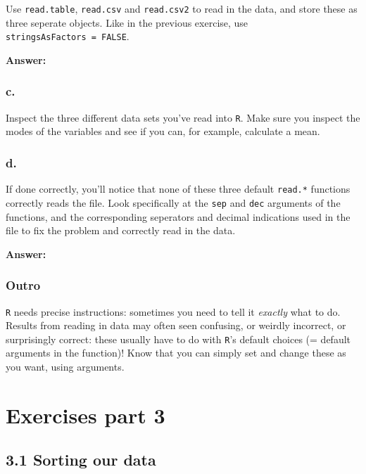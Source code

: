 \documentclass[]{article}
\begin{document}
Use \texttt{read.table}, \texttt{read.csv} and \texttt{read.csv2} to
read in the data, and store these as three seperate objects. Like in the
previous exercise, use \texttt{stringsAsFactors\ =\ FALSE}.

\textbf{Answer:}

\hypertarget{c.-5}{%
\subsubsection{c.}\label{c.-5}}

Inspect the three different data sets you've read into \texttt{R}. Make
sure you inspect the modes of the variables and see if you can, for
example, calculate a mean.

\hypertarget{d.-5}{%
\subsubsection{d.}\label{d.-5}}

If done correctly, you'll notice that none of these three default
\texttt{read.*} functions correctly reads the file. Look specifically at
the \texttt{sep} and \texttt{dec} arguments of the functions, and the
corresponding seperators and decimal indications used in the file to fix
the problem and correctly read in the data.

\textbf{Answer:}

\hypertarget{outro-2}{%
\subsubsection{Outro}\label{outro-2}}

\texttt{R} needs precise instructions: sometimes you need to tell it
\emph{exactly} what to do. Results from reading in data may often seen
confusing, or weirdly incorrect, or surprisingly correct: these usually
have to do with \texttt{R}'s default choices (= default arguments in the
function)! Know that you can simply set and change these as you want,
using arguments.

\newpage

\hypertarget{exercises-part-3}{%
\section{Exercises part 3}\label{exercises-part-3}}

\hypertarget{sorting-our-data}{%
\subsection{3.1 Sorting our data}\label{sorting-our-data}}
\end{document}
